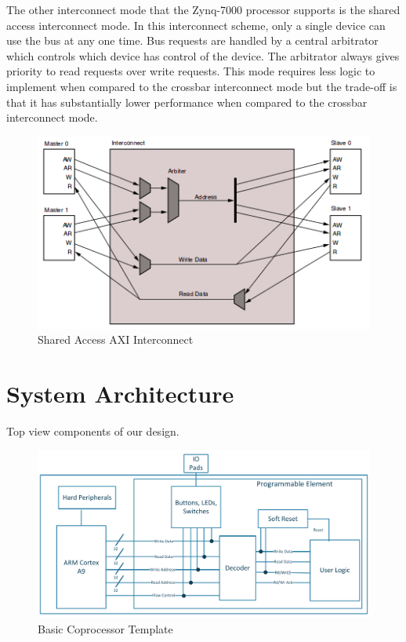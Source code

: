 \documentclass[journal]{IEEEtran}
\begin{document}
The other interconnect mode that the Zynq-7000 processor supports is the shared access interconnect mode. In this interconnect scheme, only a single device can use the bus at any one time. Bus requests are handled by a central arbitrator which controls which device has control of the device. The arbitrator always gives priority to read requests over write requests. This mode requires less logic to implement when compared to the crossbar interconnect mode but the trade-off is that it has substantially lower performance when compared to the crossbar interconnect mode.


\begin{figure}[!th]
\centering
\includegraphics[scale=.4]{Images/Shared_Access_Interconnect.png}
\caption{Shared Access AXI Interconnect \cite{AXI_Reference_Guide}}
\label{fig:Shared_Access_Interconnect}
\end{figure}





\section{System Architecture}

Top view components of our design.

\begin{figure}[!th]
\centering
\includegraphics[scale=.35]{Images/coprocessor-template.pdf}
\caption{ Basic Coprocessor Template}
\label{fig:template}
\end{figure} 
\end{document}
